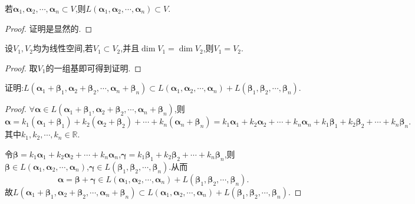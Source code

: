 \documentclass[lang=cn,newtx,10pt,scheme=chinese]{elegantbook}
\begin{document}
\begin{proposition}\label{proposition:包含所有向量的空间也包含这些向量张成的空间}
    若$\boldsymbol{\alpha }_1,\boldsymbol{\alpha }_2,\cdots ,\boldsymbol{\alpha }_n\subset V$,则$L\left( \boldsymbol{\alpha }_1,\boldsymbol{\alpha }_2,\cdots ,\boldsymbol{\alpha }_n \right) \subset V$.
\end{proposition}
\begin{proof}
    证明是显然的.
\end{proof}

\begin{proposition}\label{proposition:与全空间维数相同的子空间等于全空间}
    设\(V_1,V_2\)均为线性空间,若\(V_1\subset V_2\),并且\(\dim V_1 = \dim V_2\),则\(V_1 = V_2\).
\end{proposition}
\begin{proof}
    取$V_1$的一组基即可得到证明.
\end{proof}

\begin{proposition}\label{proposition:和空间包含于空间的和}
证明:$L\left( \boldsymbol{\alpha }_1+\boldsymbol{\beta }_1,\boldsymbol{\alpha }_2+\boldsymbol{\beta }_2,\cdots ,\boldsymbol{\alpha }_n+\boldsymbol{\beta }_n \right) \subset L\left( \boldsymbol{\alpha }_1,\boldsymbol{\alpha }_2,\cdots ,\boldsymbol{\alpha }_n \right) +L\left( \boldsymbol{\beta }_1,\boldsymbol{\beta }_2,\cdots ,\boldsymbol{\beta }_n \right)$.
\end{proposition}
\begin{proof}
    $\forall \boldsymbol{\alpha }\in L(\boldsymbol{\alpha }_1+\boldsymbol{\beta }_1,\boldsymbol{\alpha }_2+\boldsymbol{\beta }_2,\cdots,\boldsymbol{\alpha }_n+\boldsymbol{\beta }_n)$,则
\[
\boldsymbol{\alpha } = k_1(\boldsymbol{\alpha }_1+\boldsymbol{\beta }_1)+k_2(\boldsymbol{\alpha }_2+\boldsymbol{\beta }_2)+\cdots +k_n(\boldsymbol{\alpha }_n+\boldsymbol{\beta }_n) = k_1\boldsymbol{\alpha }_1 + k_2\boldsymbol{\alpha }_2+\cdots +k_n\boldsymbol{\alpha }_n + k_1\boldsymbol{\beta }_1 + k_2\boldsymbol{\beta }_2+\cdots +k_n\boldsymbol{\beta }_n.
\]
其中$k_1,k_2,\cdots,k_n\in \mathbb{R}$.

令$\boldsymbol{\beta } = k_1\boldsymbol{\alpha }_1 + k_2\boldsymbol{\alpha }_2+\cdots +k_n\boldsymbol{\alpha }_n$,$\boldsymbol{\gamma } = k_1\boldsymbol{\beta }_1 + k_2\boldsymbol{\beta }_2+\cdots +k_n\boldsymbol{\beta }_n$,则$\boldsymbol{\beta }\in L(\boldsymbol{\alpha }_1,\boldsymbol{\alpha }_2,\cdots,\boldsymbol{\alpha }_n)$,$\boldsymbol{\gamma }\in L(\boldsymbol{\beta }_1,\boldsymbol{\beta }_2,\cdots,\boldsymbol{\beta }_n)$.从而
\[
\boldsymbol{\alpha }=\boldsymbol{\beta }+\boldsymbol{\gamma }\in L(\boldsymbol{\alpha }_1,\boldsymbol{\alpha }_2,\cdots,\boldsymbol{\alpha }_n)+L(\boldsymbol{\beta }_1,\boldsymbol{\beta }_2,\cdots,\boldsymbol{\beta }_n).
\]
故$L\left( \boldsymbol{\alpha }_1+\boldsymbol{\beta }_1,\boldsymbol{\alpha }_2+\boldsymbol{\beta }_2,\cdots ,\boldsymbol{\alpha }_n+\boldsymbol{\beta }_n \right) \subset L\left( \boldsymbol{\alpha }_1,\boldsymbol{\alpha }_2,\cdots ,\boldsymbol{\alpha }_n \right) +L\left( \boldsymbol{\beta }_1,\boldsymbol{\beta }_2,\cdots ,\boldsymbol{\beta }_n \right)$.
\end{proof}
\end{document}
